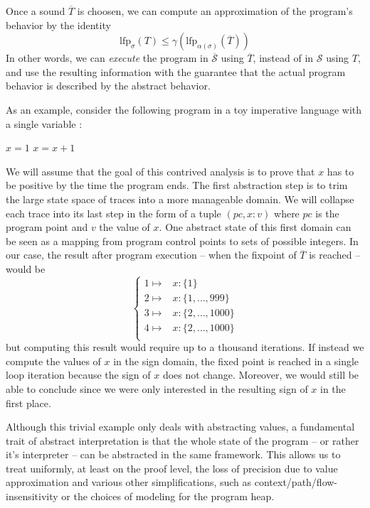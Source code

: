 \documentclass[11pt]{article}
\renewcommand{\S}{\mathcal{S}}
\newcommand{\oS}{\overline{\mathcal{S}}}
\begin{document}
Once a sound $\overline{T}$ is choosen, we can compute an approximation of the program's behavior by the identity
\[ \text{lfp}_\sigma(T) \leq \gamma(\text{lfp}_{\alpha(\sigma)}(\overline{T})) \]
In other words, we can \emph{execute} the program in $\oS$ using $\overline{T}$, instead of in $\S$ using $T$, and use the resulting information with the guarantee that the actual program behavior is described by the abstract behavior.

As an example, consider the following program in a toy imperative language with a single variable :

\begin{algorithmic}[1]
\State $x = 1$
\State $x = x+1$
\EndWhile
\end{algorithmic}


We will assume that the goal of this contrived analysis is to prove that $x$ has to be positive by the time the program ends. The first abstraction step is to trim the large state space of traces into a more manageable domain. We will collapse each trace into its last step in the form of a tuple $\left(pc,x:v\right)$ where $pc$ is the program point and $v$ the value of $x$. One abstract state of this first domain can be seen as a mapping from program control points to sets of possible integers. In our case, the result after program execution -- when the fixpoint of $\overline{T}$ is reached -- would be
\[
\begin{cases}
1 \mapsto & x:\{1\} \\
2 \mapsto & x:\{1, \dots, 999\} \\
3 \mapsto & x:\{2, \dots, 1000\} \\
4 \mapsto & x:\{2, \dots, 1000\} \\
\end{cases}
\]
but computing this result would require up to a thousand iterations. If instead we compute the values of $x$ in the sign domain, the fixed point is reached in a single loop iteration because the sign of $x$ does not change. Moreover, we would still be able to conclude since we were only interested in the resulting sign of $x$ in the first place.

Although this trivial example only deals with abstracting values, a fundamental trait of abstract interpretation is that the whole state of the program -- or rather it's interpreter -- can be abstracted in the same framework. This allows us to treat uniformly, at least on the proof level, the loss of precision due to value approximation and various other simplifications, such as context/path/flow-insensitivity or the choices of modeling for the program heap. 
\end{document}

